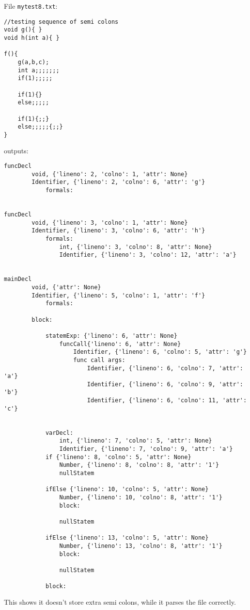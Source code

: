 \documentclass{article}
\begin{document}
\begin{itemize}
        File \verb|mytest8.txt|:
        \begin{verbatim}
//testing sequence of semi colons
void g(){ }
void h(int a){ }

f(){
    g(a,b,c);
    int a;;;;;;;
    if(1);;;;;

    if(1){}
    else;;;;;

    if(1){;;}
    else;;;;;{;;}
}
        \end{verbatim}
        outputs:
        \begin{verbatim}
funcDecl
        void, {'lineno': 2, 'colno': 1, 'attr': None}
        Identifier, {'lineno': 2, 'colno': 6, 'attr': 'g'}
            formals:


funcDecl
        void, {'lineno': 3, 'colno': 1, 'attr': None}
        Identifier, {'lineno': 3, 'colno': 6, 'attr': 'h'}
            formals:
                int, {'lineno': 3, 'colno': 8, 'attr': None}
                Identifier, {'lineno': 3, 'colno': 12, 'attr': 'a'}


mainDecl
        void, {'attr': None}
        Identifier, {'lineno': 5, 'colno': 1, 'attr': 'f'}
            formals:

        block:

            statemExp: {'lineno': 6, 'attr': None}
                funcCall{'lineno': 6, 'attr': None}
                    Identifier, {'lineno': 6, 'colno': 5, 'attr': 'g'}
                    func call args:
                        Identifier, {'lineno': 6, 'colno': 7, 'attr': 'a'}
                        Identifier, {'lineno': 6, 'colno': 9, 'attr': 'b'}
                        Identifier, {'lineno': 6, 'colno': 11, 'attr': 'c'}


            varDecl:
                int, {'lineno': 7, 'colno': 5, 'attr': None}
                Identifier, {'lineno': 7, 'colno': 9, 'attr': 'a'}
            if {'lineno': 8, 'colno': 5, 'attr': None}
                Number, {'lineno': 8, 'colno': 8, 'attr': '1'}
                nullStatem

            ifElse {'lineno': 10, 'colno': 5, 'attr': None}
                Number, {'lineno': 10, 'colno': 8, 'attr': '1'}
                block:

                nullStatem

            ifElse {'lineno': 13, 'colno': 5, 'attr': None}
                Number, {'lineno': 13, 'colno': 8, 'attr': '1'}
                block:

                nullStatem

            block:
        \end{verbatim}
        This shows it doesn't store extra semi colons, while it parses the file correctly.


\end{itemize}
\end{document}
